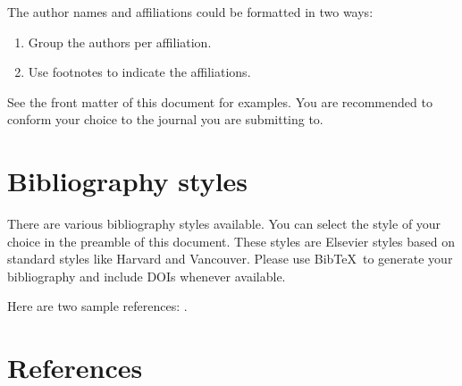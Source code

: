 \documentclass[review]{elsarticle}
\begin{document}
The author names and affiliations could be formatted in two ways:
\begin{enumerate}[(1)]
\item Group the authors per affiliation.
\item Use footnotes to indicate the affiliations.
\end{enumerate}
See the front matter of this document for examples. You are recommended to conform your choice to the journal you are submitting to.

\section{Bibliography styles}

There are various bibliography styles available. You can select the style of your choice in the preamble of this document. These styles are Elsevier styles based on standard styles like Harvard and Vancouver. Please use Bib\TeX\ to generate your bibliography and include DOIs whenever available.

Here are two sample references: \cite{Feynman1963118,Dirac1953888}.

\section*{References}

\end{document}
